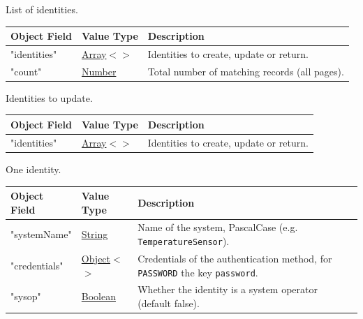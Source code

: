 \documentclass[a4paper]{arrowhead}
\newcommand{\mref}[2][]{{\textcolor{ArrowheadPurple}{\hyperref[sec:model:#2]{\ifstrempty{#1}{#2}{#1}}}}}
\newcommand{\pref}[1]{{\textcolor{ArrowheadGrey}{\hyperref[sec:model:primitives:#1]{#1}}}}
\begin{document}

List of identities.


\noindent\begin{tabularx}{\textwidth}{| >{\raggedright\arraybackslash}p{3.9cm} | >{\raggedright\arraybackslash\small}p{5.3cm} | X |} \hline
\rowcolor{gray!33} Object Field & Value Type & Description \\ \hline
"identities" & \pref{Array}$<$\allowbreak{}\mref{IdentityMgmtResponse}$>$ & Identities to create, update or return. \\ \hline
"count" & \pref{Number} & Total number of matching records (all pages). \\ \hline
\end{tabularx}




Identities to update.


\noindent\begin{tabularx}{\textwidth}{| >{\raggedright\arraybackslash}p{3.9cm} | >{\raggedright\arraybackslash\small}p{5.3cm} | X |} \hline
\rowcolor{gray!33} Object Field & Value Type & Description \\ \hline
"identities" & \pref{Array}$<$\allowbreak{}\mref{IdentityMgmtRequest}$>$ & Identities to create, update or return. \\ \hline
\end{tabularx}




One identity.


\noindent\begin{tabularx}{\textwidth}{| >{\raggedright\arraybackslash}p{3.9cm} | >{\raggedright\arraybackslash\small}p{5.3cm} | X |} \hline
\rowcolor{gray!33} Object Field & Value Type & Description \\ \hline
"system\allowbreak{}Name" & \pref{String} & Name of the system, PascalCase (e.g. \texttt{TemperatureSensor}). \\ \hline
"credentials" & \pref{Object}$<$\allowbreak{}\pref{String}$>$ & Credentials of the authentication method, for \texttt{PASSWORD} the key \texttt{password}. \\ \hline
"sysop" & \pref{Boolean} & Whether the identity is a system operator (default false). \\ \hline
\end{tabularx}
\end{document}
